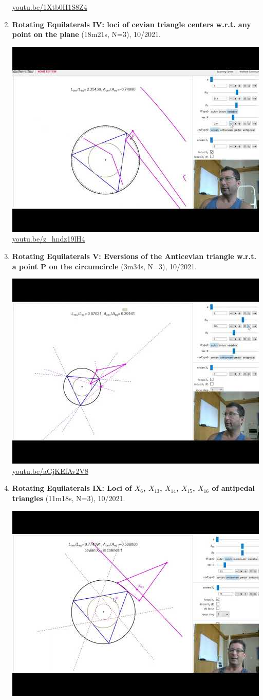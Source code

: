 \documentclass[12pt]{amsart}
\begin{document}
\begin{enumerate}[resume]
\begin{center}
\href{https://youtu.be/1Xtb0H1S8Z4}{\url{youtu.be/1Xtb0H1S8Z4}}\end{center}
% 
\item \textbf{Rotating Equilaterals IV: loci of cevian triangle centers w.r.t. any point on the plane} (18m21s, N=3), 10/2021. 
\begin{center}\includegraphics[width=.5\textwidth]{pics/z_hndz19lH4.jpg} \\ 
\href{https://youtu.be/z_hndz19lH4}{\url{youtu.be/z\_hndz19lH4}}\end{center}
% 
\item \textbf{Rotating Equilaterals V: Eversions of the Anticevian triangle w.r.t. a point P on the circumcircle} (3m34s, N=3), 10/2021. 
\begin{center}\includegraphics[width=.5\textwidth]{pics/aGjKEfAv2V8.jpg} \\ 
\href{https://youtu.be/aGjKEfAv2V8}{\url{youtu.be/aGjKEfAv2V8}}\end{center}
% 
\item \textbf{Rotating Equilaterals IX: Loci of $X_{6}$, $X_{13}$, $X_{14}$, $X_{15}$, $X_{16}$ of antipedal triangles} (11m18s, N=3), 10/2021. 
\begin{center}\includegraphics[width=.5\textwidth]{pics/RF6Mm65qQgI.jpg} \\ 

\end{center}
\end{enumerate}
\end{document}
